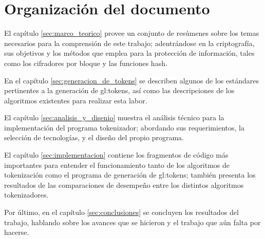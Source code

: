 

\section{Organización del documento}

El capítulo \ref{sec:marco_teorico} provee un conjunto de resúmenes sobre los
temas necesarios para la comprensión de este trabajo; adentrándose en la
criptografía, sus objetivos y los métodos que emplea para la protección de
información, tales como los cifradores por bloque y las funciones hash.

En el capítulo \ref{sec:generacion_de_tokens} se describen algunos de los
estándares pertinentes a la generación de \glspl{gl:token}, así como las
descripciones de los algoritmos existentes para realizar esta labor.

El capítulo \ref{sec:analisis_y_disenio} muestra el análisis técnico para
la implementación del programa tokenizador; abordando sus requerimientos,
la selección de tecnologías, y el diseño del propio programa.

El capítulo \ref{sec:implementacion} contiene los fragmentos de código más
importantes para entender el funcionamiento tanto de los algoritmos de
tokenización como el programa de generación de \glspl{gl:token}; también
presenta los resultados de las comparaciones de desempeño entre los
distintos algoritmos tokenizadores.

Por último, en el capítulo \ref{sec:conclusiones} se concluyen los resultados
del trabajo, hablando sobre los avances que se hicieron y el trabajo que aún
falta por hacerse.
